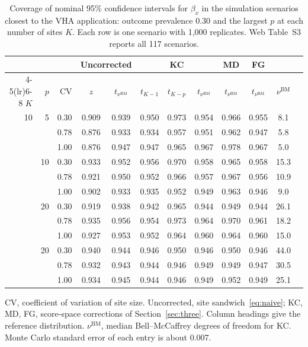 \documentclass[12pt]{article}
\theoremstyle{remark}
\begin{document}
\begin{table}[ht]
\centering
\caption{Coverage of nominal 95\% confidence intervals for $\beta_x$ in the
simulation scenarios closest to the VHA application: outcome prevalence 0.30 and
the largest $p$ at each number of sites $K$. Each row is one scenario with
1{,}000 replicates. Web Table~S3 reports all 117 scenarios.}
\label{tab:simulation}
\footnotesize
\setlength{\tabcolsep}{4pt}
\begin{tabular*}{\textwidth}{@{\extracolsep{\fill}}rrrccccccccr}
\toprule
& & & \multicolumn{2}{c}{Uncorrected} & \multicolumn{3}{c}{KC} & MD & FG & \\
\cmidrule(lr){4-5}\cmidrule(lr){6-8}
$K$ & $p$ & CV & $z$ & $t_{\nu^{\mathrm{BM}}}$ & $t_{K-1}$ & $t_{K-p}$ &
$t_{\nu^{\mathrm{BM}}}$ & $t_{\nu^{\mathrm{BM}}}$ & $t_{\nu^{\mathrm{BM}}}$ &
$\nu^{\mathrm{BM}}$\\
\midrule
10 & 5 & 0.30 & 0.909 & 0.939 & 0.950 & 0.973 & 0.954 & 0.966 & 0.955 & 8.1\\
 &  & 0.78 & 0.876 & 0.933 & 0.934 & 0.957 & 0.951 & 0.962 & 0.947 & 5.8\\
 &  & 1.00 & 0.876 & 0.947 & 0.947 & 0.965 & 0.967 & 0.978 & 0.967 & 5.0\\
\addlinespace
18 & 10 & 0.30 & 0.933 & 0.952 & 0.956 & 0.970 & 0.958 & 0.965 & 0.958 & 15.3\\
 &  & 0.78 & 0.921 & 0.950 & 0.952 & 0.966 & 0.957 & 0.967 & 0.956 & 10.9\\
 &  & 1.00 & 0.902 & 0.933 & 0.935 & 0.952 & 0.949 & 0.963 & 0.946 & 9.0\\
\addlinespace
30 & 20 & 0.30 & 0.919 & 0.938 & 0.942 & 0.965 & 0.944 & 0.949 & 0.944 & 26.1\\
 &  & 0.78 & 0.935 & 0.956 & 0.954 & 0.973 & 0.964 & 0.970 & 0.961 & 18.2\\
 &  & 1.00 & 0.927 & 0.953 & 0.952 & 0.964 & 0.960 & 0.964 & 0.960 & 15.0\\
\addlinespace
50 & 20 & 0.30 & 0.940 & 0.944 & 0.946 & 0.950 & 0.946 & 0.950 & 0.946 & 44.0\\
 &  & 0.78 & 0.932 & 0.943 & 0.944 & 0.946 & 0.949 & 0.949 & 0.947 & 30.5\\
 &  & 1.00 & 0.934 & 0.945 & 0.944 & 0.946 & 0.949 & 0.952 & 0.949 & 25.1\\
\bottomrule
\end{tabular*}

\vspace{3pt}
\parbox{\textwidth}{\footnotesize CV, coefficient of variation of site size.
Uncorrected, site sandwich~\eqref{eq:naive}; KC, MD, FG, score-space corrections
of Section~\ref{sec:three}. Column headings give the reference distribution.
$\nu^{\mathrm{BM}}$, median Bell--McCaffrey degrees of freedom for KC. Monte Carlo
standard error of each entry is about 0.007.}
\end{table}
\end{document}
